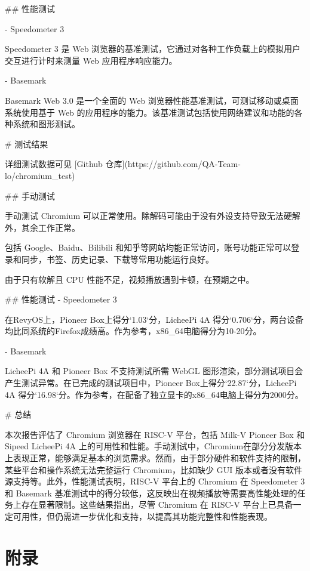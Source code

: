 \documentclass{article}
\begin{document}
\begin{markdown}
## 性能测试

- Speedometer 3

Speedometer 3 是 Web 浏览器的基准测试，它通过对各种工作负载上的模拟用户交互进行计时来测量 Web 应用程序响应能力。

- Basemark

Basemark Web 3.0 是一个全面的 Web 浏览器性能基准测试，可测试移动或桌面系统使用基于 Web 的应用程序的能力。该基准测试包括使用网络建议和功能的各种系统和图形测试。

# 测试结果

详细测试数据可见 [Github 仓库](https://github.com/QA-Team-lo/chromium_test)

## 手动测试

手动测试 Chromium 可以正常使用。除解码可能由于没有外设支持导致无法硬解外，其余工作正常。

包括 Google、Baidu、Bilibili 和知乎等网站均能正常访问，账号功能正常可以登录和同步，书签、历史记录、下载等常用功能运行良好。

由于只有软解且 CPU 性能不足，视频播放遇到卡顿，在预期之中。

## 性能测试
- Speedometer 3

在RevyOS上，Pioneer Box上得分`1.03`分，LicheePi 4A 得分`0.706`分，两台设备均比同系统的Firefox成绩高。作为参考，x86_64电脑得分为10-20分。

- Basemark

LicheePi 4A 和 Pioneer Box 不支持测试所需 WebGL 图形渲染，部分测试项目会产生测试异常。在已完成的测试项目中，Pioneer Box上得分`22.87`分，LicheePi 4A 得分`16.98`分。作为参考，在配备了独立显卡的x86_64电脑上得分为2000分。

# 总结

本次报告评估了 Chromium 浏览器在 RISC-V 平台，包括 Milk-V Pioneer Box 和 Sipeed LicheePi 4A 上的可用性和性能。手动测试中，Chromium在部分分发版本上表现正常，能够满足基本的浏览需求。然而，由于部分硬件和软件支持的限制，某些平台和操作系统无法完整运行 Chromium，比如缺少 GUI 版本或者没有软件源支持等。此外，性能测试表明，RISC-V 平台上的 Chromium 在 Speedometer 3 和 Basemark 基准测试中的得分较低，这反映出在视频播放等需要高性能处理的任务上存在显著限制。这些结果指出，尽管 Chromium 在 RISC-V 平台上已具备一定可用性，但仍需进一步优化和支持，以提高其功能完整性和性能表现。

\end{markdown}

\newpage
\section{附录}

\appendix

\end{document}
